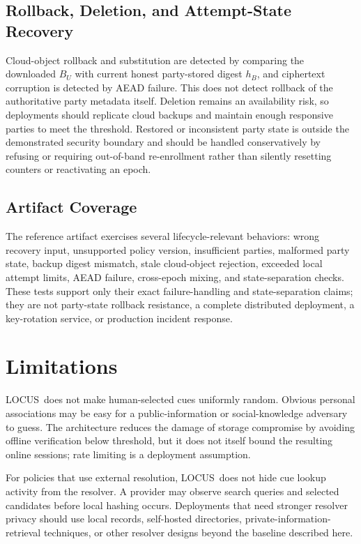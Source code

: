 \documentclass[sigconf,anonymous]{acmart}
\newcommand{\LOCUS}{\textsf{LOCUS}}
\begin{document}
\subsection{Rollback, Deletion, and Attempt-State Recovery}

Cloud-object rollback and substitution are detected by comparing the downloaded \(B_U\) with current honest party-stored digest \(h_B\), and ciphertext corruption is detected by AEAD failure. This does not detect rollback of the authoritative party metadata itself. Deletion remains an availability risk, so deployments should replicate cloud backups and maintain enough responsive parties to meet the threshold. Restored or inconsistent party state is outside the demonstrated security boundary and should be handled conservatively by refusing or requiring out-of-band re-enrollment rather than silently resetting counters or reactivating an epoch.

\subsection{Artifact Coverage}

The reference artifact exercises several lifecycle-relevant behaviors: wrong recovery input, unsupported policy version, insufficient parties, malformed party state, backup digest mismatch, stale cloud-object rejection, exceeded local attempt limits, AEAD failure, cross-epoch mixing, and state-separation checks. These tests support only their exact failure-handling and state-separation claims; they are not party-state rollback resistance, a complete distributed deployment, a key-rotation service, or production incident response.

\section{Limitations}
\label{sec:limitations}

\LOCUS\ does not make human-selected cues uniformly random. Obvious personal associations may be easy for a public-information or social-knowledge adversary to guess. The architecture reduces the damage of storage compromise by avoiding offline verification below threshold, but it does not itself bound the resulting online sessions; rate limiting is a deployment assumption.

For policies that use external resolution, \LOCUS\ does not hide cue lookup activity from the resolver. A provider may observe search queries and selected candidates before local hashing occurs. Deployments that need stronger resolver privacy should use local records, self-hosted directories, private-information-retrieval techniques, or other resolver designs beyond the baseline described here.
\end{document}
